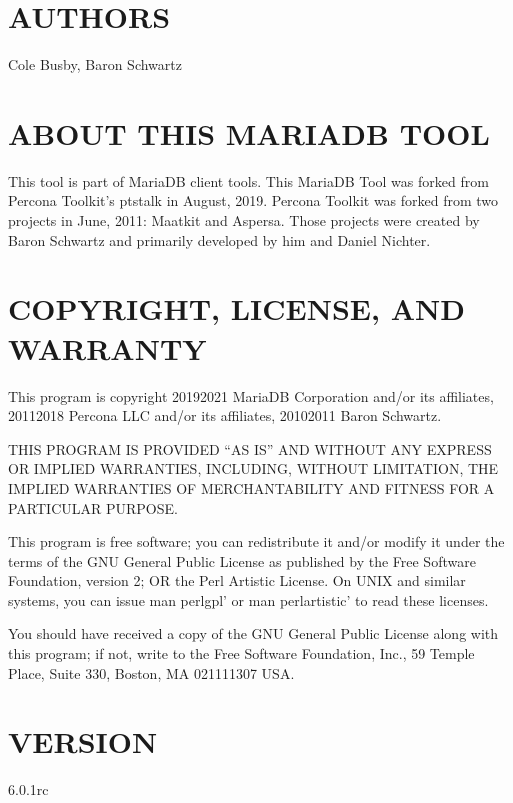 \documentclass[letterpaper,10pt,english]{sphinxmanual}
\begin{document}
\section{AUTHORS}
\label{\detokenize{mariadb-stat-browser:authors}}
\sphinxAtStartPar
Cole Busby, Baron Schwartz


\section{ABOUT THIS MARIADB TOOL}
\label{\detokenize{mariadb-stat-browser:about-this-mariadb-tool}}
\sphinxAtStartPar
This tool is part of MariaDB client tools. This MariaDB Tool was forked from
Percona Toolkit’s pt\sphinxhyphen{}stalk in August, 2019. Percona Toolkit was forked from two
projects in June, 2011: Maatkit and Aspersa.  Those projects were created by
Baron Schwartz and primarily developed by him and Daniel Nichter.


\section{COPYRIGHT, LICENSE, AND WARRANTY}
\label{\detokenize{mariadb-stat-browser:copyright-license-and-warranty}}
\sphinxAtStartPar
This program is copyright 2019\sphinxhyphen{}2021 MariaDB Corporation and/or its affiliates,
2011\sphinxhyphen{}2018 Percona LLC and/or its affiliates, 2010\sphinxhyphen{}2011 Baron Schwartz.

\sphinxAtStartPar
THIS PROGRAM IS PROVIDED “AS IS” AND WITHOUT ANY EXPRESS OR IMPLIED
WARRANTIES, INCLUDING, WITHOUT LIMITATION, THE IMPLIED WARRANTIES OF
MERCHANTABILITY AND FITNESS FOR A PARTICULAR PURPOSE.

\sphinxAtStartPar
This program is free software; you can redistribute it and/or modify it under
the terms of the GNU General Public License as published by the Free Software
Foundation, version 2; OR the Perl Artistic License.  On UNIX and similar
systems, you can issue \textasciigrave{}man perlgpl’ or \textasciigrave{}man perlartistic’ to read these
licenses.

\sphinxAtStartPar
You should have received a copy of the GNU General Public License along with
this program; if not, write to the Free Software Foundation, Inc., 59 Temple
Place, Suite 330, Boston, MA  02111\sphinxhyphen{}1307  USA.


\section{VERSION}
\label{\detokenize{mariadb-stat-browser:version}}
\sphinxAtStartPar
{} 6.0.1rc
\end{document}
